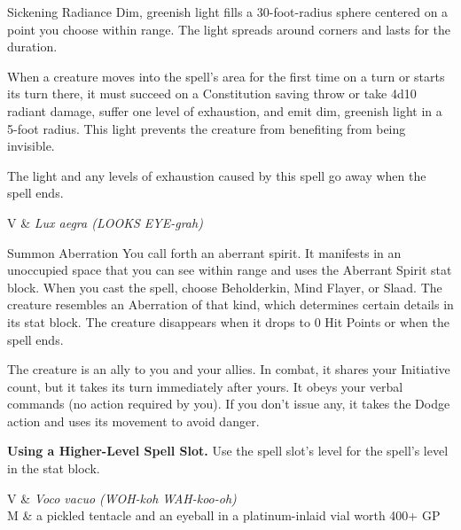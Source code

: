 \begin{Spell}[
  tags=Concentration,
  level={4th},
  time={1 action},
  range={120 ft/30 ft r sphere},
  components={V, S},
  duration={10 minutes},
  school={Evocation},
  attack={CON Save},
  effect={Radiant, Exhaustion}
]{Sickening Radiance}
Dim, greenish light fills a 30-foot-radius sphere centered on a point you choose within range. The light spreads around corners and lasts for the duration.

When a creature moves into the spell's area for the first time on a turn or starts its turn there, it must succeed on a Constitution saving throw or take 4d10 radiant damage, suffer one level of exhaustion, and emit dim, greenish light in a 5-foot radius. This light prevents the creature from benefiting from being invisible.

The light and any levels of exhaustion caused by this spell go away when the spell ends.

\begin{components}
V & \textit{Lux aegra (LOOKS EYE-grah)}
\end{components}
\end{Spell}


\begin{Spell}[
  tags=Concentration,
  level={4th},
  time={1 action},
  range={90 ft},
  components={V, S, M},
  duration={Concentration 1 hour},
  school={Conjuration},
  attack={None},
  effect={Summoning}
]{Summon Aberration}
You call forth an aberrant spirit. It manifests in an unoccupied space that you can see within range and uses the Aberrant Spirit stat block. When you cast the spell, choose Beholderkin, Mind Flayer, or Slaad. The creature resembles an Aberration of that kind, which determines certain details in its stat block. The creature disappears when it drops to 0 Hit Points or when the spell ends.

The creature is an ally to you and your allies. In combat, it shares your Initiative count, but it takes its turn immediately after yours. It obeys your verbal commands (no action required by you). If you don't issue any, it takes the Dodge action and uses its movement to avoid danger.

\textbf{Using a Higher-Level Spell Slot.} Use the spell slot's level for the spell's level in the stat block.

\begin{components}
V & \textit{Voco vacuo (WOH-koh WAH-koo-oh)} \\
M & a pickled tentacle and an eyeball in a platinum-inlaid vial worth 400+ GP
\end{components}
\end{Spell}



